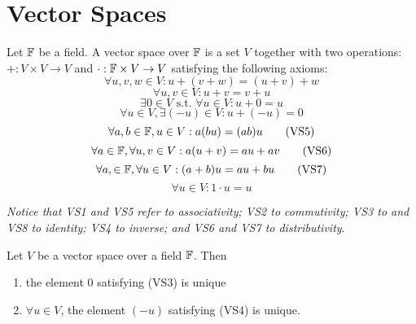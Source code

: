\section{Vector Spaces}
\begin{mydef}\normalfont
Let \(\mathbb{F}\) be a field. A vector space over \(\mathbb{F}\) is a set \(V\) together with two operations: \(+: V\times V \to V\) and \(\cdot:\mathbb{F}\times V\to V\) satisfying the following axioms:
%
\begin{equation}\forall u,v,w\in V : u+(v+w)=(u+v)+w\tag{VS1}\end{equation}
\begin{equation}\forall u,v\in V : u+v=v+u\tag{VS2}\end{equation}
\begin{equation}\exists0\in V \text{ s.t. } \forall u\in V : u + 0 = u\tag{VS3}\end{equation}
\begin{equation}\forall u\in V, \exists(-u)\in V : u+(-u) = 0\tag{VS4}\end{equation}
\begin{equation}\forall a,b \in \mathbb{F}, u \in V : a(bu) = (ab)u\tag{VS5}\end{equation}
\begin{equation}\forall a\in\mathbb{F}, \forall u,v\in V : a(u+v) = au+av\tag{VS6}\end{equation}
\begin{equation}\forall a,\in\mathbb{F}, \forall u\in V : (a+b)u = au+bu\tag{VS7}\end{equation}
\begin{equation}\forall u\in V : 1\cdot u=u\tag{VS8}\end{equation}

\textit{Notice that VS1 and VS5 refer to associativity; VS2 to commutivity; VS3 to and VS8 to identity; VS4 to inverse; and VS6 and VS7 to distributivity}.
\end{mydef}

\begin{mythm} \normalfont
Let \(V\) be a vector space over a field \(\mathbb{F}\). Then 
\begin{enumerate}
	\item the element 0 satisfying (VS3) is unique
	\item \(\forall u\in V\), the element \((-u)\) satisfying (VS4) is unique.
\end{enumerate}
\end{mythm}


